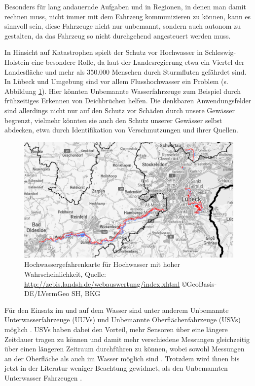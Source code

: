 \documentclass[11pt]{article}
\begin{document}
Besonders für lang andauernde Aufgaben und in Regionen, in denen man damit rechnen muss, nicht immer mit dem Fahrzeug kommunizieren zu können, kann es sinnvoll sein, diese Fahrzeuge nicht nur unbemannt, sondern auch autonom zu gestalten, da das Fahrzeug so nicht durchgehend angesteuert werden muss.

In Hinsicht auf Katastrophen spielt der Schutz vor Hochwasser in Schleswig-Holstein eine besondere Rolle, da laut der Landesregierung etwa ein Viertel der Landesfläche und mehr als 350.000 Menschen durch Sturmfluten gefährdet sind\cite{Hochwasser}. In Lübeck und Umgebung sind vor allem Flusshochwasser ein Problem (s. Abbildung \ref{Hochwassergefahrenkarte}). Hier könnten Unbemannte Wasserfahrzeuge zum Beispiel durch frühzeitiges Erkennen von Deichbrüchen helfen. Die denkbaren Anwendungsfelder sind allerdings nicht nur auf den Schutz vor Schäden durch unsere Gewässer begrenzt, vielmehr könnten sie auch den Schutz unserer Gewässer selbst abdecken, etwa durch Identifikation von Verschmutzungen und ihrer Quellen.

\begin{figure}[h]
	\centering
	\includegraphics[width=0.8\linewidth]{Hochwasserrisiko.png}
	\caption{Hochwassergefahrenkarte für Hochwasser mit hoher Wahrscheinlichkeit, Quelle: \protect\url{http://zebis.landsh.de/webauswertung/index.xhtml} ©GeoBasis-DE/LVermGeo SH, BKG}
	\label{Hochwassergefahrenkarte}
\end{figure}

Für den Einsatz im und auf dem Wasser sind unter anderem Unbemannte Unterwasserfahrzeuge (UUVs) und Unbemannte Oberflächenfahrzeuge (USVs) möglich \cite{surveyDisasterRobotics}. USVs haben dabei den Vorteil, mehr Sensoren über eine längere Zeitdauer tragen zu können und damit mehr verschiedene Messungen gleichzeitig über einen längeren Zeitraum durchführen zu können, wobei sowohl Messungen an der Oberfläche als auch im Wasser möglich sind \cite{coley2015}. Trotzdem wird ihnen bis jetzt in der Literatur weniger Beachtung gewidmet, als den Unbemannten Unterwasser Fahrzeugen \cite{surveyDisasterRobotics}. \newline
\end{document}
